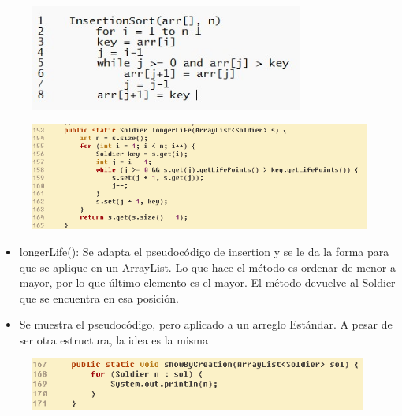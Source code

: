\documentclass{article}
\begin{document}
	\begin{figure}[H]
		\centering
		\includegraphics[width=0.8\textwidth,keepaspectratio]{img/insertion.jpg}
	\end{figure}
	
	\begin{figure}[H]
		\centering
		\includegraphics[width=1\textwidth,keepaspectratio]{img/longerLife.png}
	\end{figure}
	
	
	\begin{itemize}	
		\item longerLife(): Se adapta el pseudocódigo de insertion y se le da la forma para que se aplique en un ArrayList. Lo que hace el método es ordenar de menor a mayor, por lo que último elemento es el mayor. El método devuelve al Soldier que se encuentra en esa posición.
		\item Se muestra el pseudocódigo, pero aplicado a un arreglo Estándar. A pesar de ser otra estructura, la idea es la misma
	\end{itemize}
		
		
	\begin{figure}[H]
		\centering
		\includegraphics[width=0.99\textwidth,keepaspectratio]{img/showByCreation.png}
	\end{figure}
	
\end{document}

